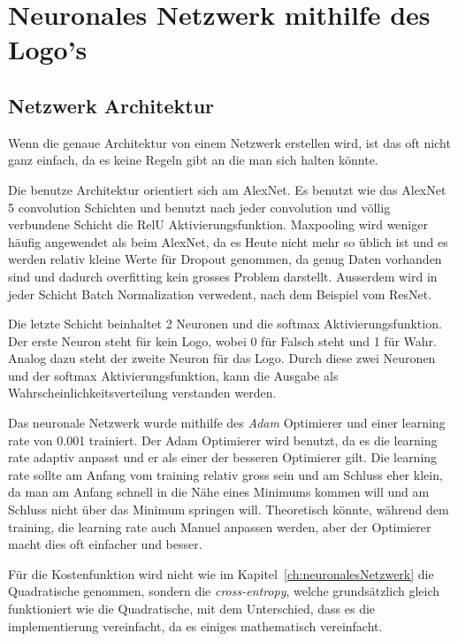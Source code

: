 \documentclass[12pt,a4paper]{report}
\begin{document}
\section{Neuronales Netzwerk mithilfe des Logo's}
\subsection{Netzwerk Architektur}
Wenn die genaue Architektur von einem Netzwerk erstellen wird, ist das oft nicht ganz einfach,
da es keine Regeln gibt an die man sich halten könnte.

Die benutze Architektur orientiert sich am AlexNet\cite{alex}.
Es benutzt wie das AlexNet 5 convolution Schichten und benutzt nach jeder convolution und völlig verbundene
Schicht die RelU Aktivierungsfunktion.
Maxpooling wird weniger häufig angewendet als beim AlexNet, da es Heute nicht mehr so üblich ist\cite{conv} und
es werden relativ kleine Werte für Dropout genommen, da genug Daten vorhanden sind und dadurch overfitting kein grosses Problem darstellt.
Ausserdem wird in jeder Schicht Batch Normalization verwedent, nach dem Beispiel vom ResNet.\cite{conv}

Die letzte Schicht beinhaltet 2 Neuronen und die softmax Aktivierungsfunktion.
Der erste Neuron steht für kein Logo, wobei 0 für Falsch steht und 1 für Wahr.
Analog dazu steht der zweite Neuron für das Logo.
Durch diese zwei Neuronen und der softmax Aktivierungsfunktion, kann die Ausgabe als Wahrscheinlichkeitsverteilung verstanden werden.

Das neuronale Netzwerk wurde mithilfe des \textit{Adam} Optimierer\cite{adam} und einer learning rate von 0.001 trainiert.
Der Adam Optimierer wird benutzt, da es die learning rate adaptiv anpasst und er als einer der besseren Optimierer gilt\cite{adam}.
Die learning rate sollte am Anfang vom training relativ gross sein und am Schluss eher klein, da man am Anfang schnell in die Nähe eines Minimums kommen will
und am Schluss nicht über das Minimum springen will.
Theoretisch könnte, während dem training, die learning rate auch Manuel anpassen werden, aber der Optimierer macht dies oft einfacher und besser.

Für die Kostenfunktion wird nicht wie im Kapitel~\ref{ch:neuronalesNetzwerk} die Quadratische genommen,
sondern die \textit{cross-entropy}\cite{softmax}, welche grundsätzlich gleich funktioniert wie die Quadratische, mit dem Unterschied,
dass es die implementierung vereinfacht, da es einiges mathematisch vereinfacht\cite{softmax}.
\end{document}
